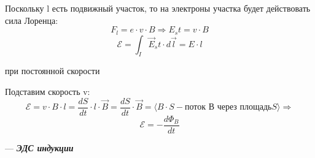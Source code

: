 \documentclass[../main.tex]{subfiles}
\begin{document}
Поскольку l есть подвижный участок, то на электроны участка будет действовать сила Лоренца:
\[F_l = e \cdot v \cdot B \Rightarrow E_st = v \cdot B\]
\[\mathscr{E} = \int_{I} \vec E_st \cdot d \vec l = E \cdot l\]
\begin{center}
    при постоянной скорости
\end{center}

Подставим скорость v:
\[\mathscr{E} = v \cdot B \cdot l = \frac{dS}{dt} \cdot l \cdot \vec B = \frac{dS}{dt} \cdot \vec B = \langle B \cdot S - \text{поток В через площадь} S \rangle \Rightarrow\]
\[\mathscr{E} = - \frac{d \Phi_B}{dt}\]
\begin{center}
    --- \textit{\textbf{ЭДС индукции}}
\end{center}
\end{document}
